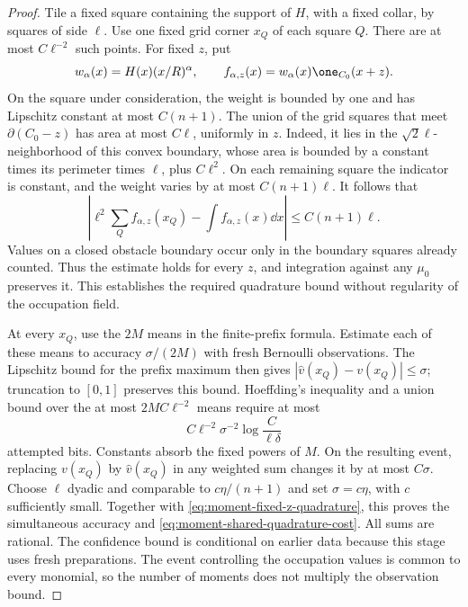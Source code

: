 \begin{proof}
Tile a fixed square containing the support of $H$, with a fixed
collar, by squares of side $\ell$.  Use one fixed grid corner
$x_Q$ of each square $Q$.  There are at most $C\ell^{-2}$ such
points.  For fixed $z$, put
\[
 w_\alpha(x)=H(x)(x/R)^\alpha,
 \qquad
 f_{\alpha,z}(x)=w_\alpha(x)\one_{C_0}(x+z).
\]
On the square under consideration, the weight is bounded by one
and has Lipschitz constant at most $C(n+1)$.  The union of the
grid squares that meet $\partial(C_0-z)$ has area at most
$C\ell$, uniformly in $z$.  Indeed, it lies in the
$\sqrt2\ell$-neighborhood of this convex boundary, whose area is
bounded by a constant times its perimeter times $\ell$, plus
$C\ell^2$.  On each remaining square the indicator is constant,
and the weight varies by at most $C(n+1)\ell$.  It follows that
\begin{equation}\label{eq:moment-fixed-z-quadrature}
 \left|\ell^2\sum_Q f_{\alpha,z}(x_Q)
                   -\int f_{\alpha,z}(x)\dd x\right|
                       \le C(n+1)\ell.
\end{equation}
Values on a closed obstacle boundary occur only in the boundary
squares already counted.  Thus the estimate holds for every $z$,
and integration against any $\mu_0$ preserves it.  This establishes
the required quadrature bound without regularity of the occupation
field.

At every $x_Q$, use the $2M$ means in the finite-prefix formula.
Estimate each of these means to accuracy $\sigma/(2M)$ with fresh
Bernoulli observations.  The Lipschitz bound for the prefix maximum
then gives $|\widehat v(x_Q)-v(x_Q)|\le\sigma$; truncation to
$[0,1]$ preserves this bound.  Hoeffding's inequality and a union
bound over the at most $2MC\ell^{-2}$ means require at most
\[
 C\ell^{-2}\sigma^{-2}\log\frac{C}{\ell\delta}
\]
attempted bits.  Constants absorb the fixed powers of $M$.
On the resulting event, replacing $v(x_Q)$ by $\widehat v(x_Q)$
in any weighted sum changes it by at most $C\sigma$.
Choose $\ell$ dyadic and comparable to $c\eta/(n+1)$ and set
$\sigma=c\eta$, with $c$ sufficiently small.  Together with
\eqref{eq:moment-fixed-z-quadrature}, this proves the simultaneous
accuracy and \eqref{eq:moment-shared-quadrature-cost}.  All sums
are rational.  The confidence bound is conditional on earlier data
because this stage uses fresh preparations.  The event controlling
the occupation values is common to every monomial, so the number
of moments does not multiply the observation bound.
\end{proof}

